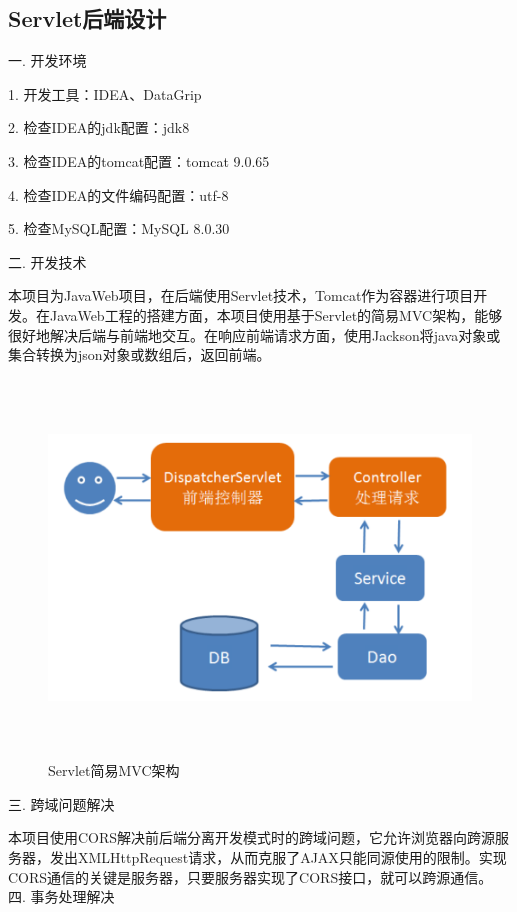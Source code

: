 \subsection{Servlet后端设计}

\noindent
一. 开发环境

1. 开发工具：IDEA、DataGrip

2. 检查IDEA的jdk配置：jdk8

3. 检查IDEA的tomcat配置：tomcat 9.0.65

4. 检查IDEA的文件编码配置：utf-8

5. 检查MySQL配置：MySQL 8.0.30

\noindent
二. 开发技术

本项目为JavaWeb项目，在后端使用Servlet技术，Tomcat作为容器进行项目开发。在JavaWeb工程的搭建方面，本项目使用基于Servlet的简易MVC架构，能够很好地解决后端与前端地交互。在响应前端请求方面，使用Jackson将java对象或集合转换为json对象或数组后，返回前端。

\begin{figure}[H]
    \centering
    \includegraphics[width=15cm,height=10cm]{figures/MVC.png}
    \caption{Servlet简易MVC架构}
\end{figure}

\noindent
三. 跨域问题解决

本项目使用CORS解决前后端分离开发模式时的跨域问题，它允许浏览器向跨源服务器，发出XMLHttpRequest请求，从而克服了AJAX只能同源使用的限制。实现CORS通信的关键是服务器，只要服务器实现了CORS接口，就可以跨源通信。~\\

\noindent
四. 事务处理解决

